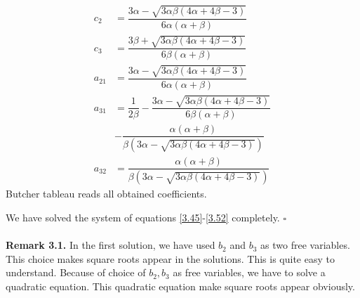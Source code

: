 \documentclass[a4paper,oneside]{book}
\numberwithin{equation}{chapter}
\begin{document}
\begin{enumerate}
\begin{enumerate}
\begin{align}
{c_2} &= \dfrac{{3\alpha  - \sqrt {3\alpha \beta \left( {4\alpha  + 4\beta  - 3} \right)} }}{{6\alpha \left( {\alpha  + \beta } \right)}}\\
{c_3} &= \dfrac{{3\beta  + \sqrt {3\alpha \beta \left( {4\alpha  + 4\beta  - 3} \right)} }}{{6\beta \left( {\alpha  + \beta } \right)}}\\
{a_{21}} &= \dfrac{{3\alpha  - \sqrt {3\alpha \beta \left( {4\alpha  + 4\beta  - 3} \right)} }}{{6\alpha \left( {\alpha  + \beta } \right)}}\\
{a_{31}} &= \dfrac{1}{{2\beta }} - \dfrac{{3\alpha  - \sqrt {3\alpha \beta \left( {4\alpha  + 4\beta  - 3} \right)} }}{{6\beta \left( {\alpha  + \beta } \right)}}\\
 &- \dfrac{{\alpha \left( {\alpha  + \beta } \right)}}{{\beta \left( {3\alpha  - \sqrt {3\alpha \beta \left( {4\alpha  + 4\beta  - 3} \right)} } \right)}}\\
{a_{32}} &= \dfrac{{\alpha \left( {\alpha  + \beta } \right)}}{{\beta \left( {3\alpha  - \sqrt {3\alpha \beta \left( {4\alpha  + 4\beta  - 3} \right)} } \right)}}
\end{align}
Butcher tableau reads all obtained coefficients.
\end{enumerate}
\end{enumerate}
We have solved the system of equations \eqref{3.45}-\eqref{3.52} completely. \hfill $\square$\\
\\
\textbf{Remark 3.1.} In the first solution, we have used $b_2$ and $b_3$ as two free variables. This choice makes square roots appear in the solutions. This is quite easy to understand. Because of choice of $b_2,b_3$ as free variables, we have to solve a quadratic equation. This quadratic equation make square roots appear obviously.\\
\end{document}

